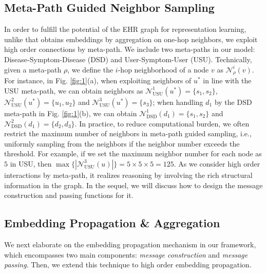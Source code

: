 \documentclass[sigconf]{acmart}
\newcommand{\bn}{\mathcal{N}}
\newcommand{\usu}{\text{USU}}
\newcommand{\dsd}{\text{DSD}}
\begin{document}
\subsection{Meta-Path Guided Neighbor Sampling}
In order to fulfill the potential of the EHR graph for representation learning, unlike \citet{hosseini2018heteromed} that obtains embeddings by aggregation on one-hop neighbors, we exploit high order connections by meta-path. We include two meta-paths in our model: Disease-Symptom-Disease (DSD) and User-Symptom-User (USU). Technically, given a meta-path $\rho$, we define the $i$-hop neighborhood of a node $v$ as $\bn_\rho^{i}(v)$. For instance, in Fig. \ref{fig:1}(a), when exploiting neighbors of $u^*$ in line with the USU meta-path, we can obtain neighbors as $\bn_{\usu}^{1}(u^*)=\{s_1,s_2\}$, $\bn_{\usu}^2(u^*)=\{u_1,u_2\}$ and $\bn_{\usu}^3(u^*)=\{s_3\}$; when handling $d_1$ by the DSD meta-path in Fig. \ref{fig:1}(b), we can obtain $\bn_{\dsd}^1(d_1)=\{s_1,s_2\}$ and $\bn_{\dsd}^2(d_1)=\{d_2,d_3\}$. In practice, to reduce computational burden, we often restrict the maximum number of neighbors in meta-path guided sampling, i.e., uniformly sampling from the neighbors if the neighbor number exceeds the threshold. For example, if we set the maximum neighbor number for each node as $5$ in USU, then $\max\{|\bn_{\usu}^3(u)|\} = 5 \times 5 \times 5 = 125$. As we consider high order interactions by meta-path, it realizes reasoning by involving the rich structural information in the graph. In the sequel, we will discuss how to design the message construction and passing functions for it.

\subsection{Embedding Propagation \& Aggregation}
We next elaborate on the embedding propagation mechanism in our framework, which encompasses two main components: \emph{message construction} and \emph{message passing}. Then, we extend this technique to high order embedding propagation.
\end{document}
